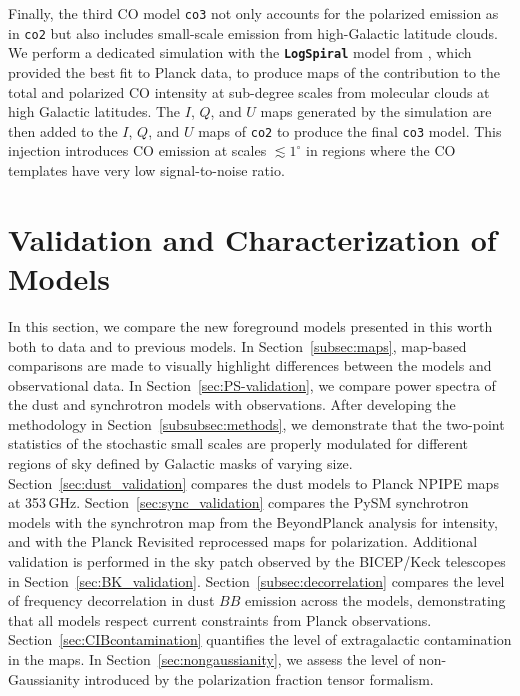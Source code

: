 \documentclass[twocolumn]{aastex631}
\begin{document}
Finally, the third CO model \texttt{co3} not only accounts for the polarized emission as in \texttt{co2} but also includes small-scale emission from high-Galactic latitude clouds. We perform a dedicated simulation with the {\bf\texttt{LogSpiral}} model from \citet{Puglisi:2017}, which provided the best fit to Planck data, to produce maps of the contribution to the total and polarized CO intensity at sub-degree scales from molecular clouds at high Galactic latitudes. The $I$, $Q$, and $U$ maps generated by the simulation are then added to the $I$, $Q$, and $U$ maps of \texttt{co2} to produce the final \texttt{co3} model. This injection introduces CO emission at scales $\lesssim1^\circ$ in regions where the CO templates have very low signal-to-noise ratio. 

 
\section{Validation and Characterization of Models} \label{sec:validation}

In this section, we compare the new foreground models presented in this worth both to data and to previous models. In Section~\ref{subsec:maps}, map-based comparisons are made to visually highlight differences between the models and observational data. In Section~\ref{sec:PS-validation}, we compare power spectra of the dust and synchrotron models with observations. After developing the methodology in Section~\ref{subsubsec:methods}, we demonstrate that the two-point statistics of the stochastic small scales are properly modulated for different regions of sky defined by Galactic masks of varying size. Section~\ref{sec:dust_validation} compares the dust models to Planck NPIPE maps at 353\,GHz. Section~\ref{sec:sync_validation} compares the PySM synchrotron models with the synchrotron map from the BeyondPlanck analysis for intensity, and with the Planck Revisited reprocessed maps for polarization. Additional validation is performed in the sky patch observed by the BICEP/Keck telescopes in Section~\ref{sec:BK_validation}. Section~\ref{subsec:decorrelation} compares the level of frequency decorrelation in dust $BB$ emission across the models, demonstrating that all models respect current constraints from Planck observations. Section~\ref{sec:CIBcontamination} quantifies the level of extragalactic contamination in the maps. In Section~\ref{sec:nongaussianity}, we assess the level of non-Gaussianity introduced by the polarization fraction tensor formalism.
\end{document}
